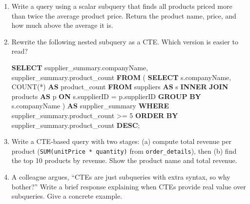 \documentclass[
  letterpaper,
  DIV=11,
  numbers=noendperiod]{scrreprt}
\newenvironment{Shaded}{\begin{snugshade}}{\end{snugshade}}
\newcommand{\DecValTok}[1]{\textcolor[rgb]{0.68,0.00,0.00}{#1}}
\newcommand{\FunctionTok}[1]{\textcolor[rgb]{0.28,0.35,0.67}{#1}}
\newcommand{\KeywordTok}[1]{\textcolor[rgb]{0.00,0.23,0.31}{\textbf{#1}}}
\newcommand{\NormalTok}[1]{\textcolor[rgb]{0.00,0.23,0.31}{#1}}
\newcommand{\OperatorTok}[1]{\textcolor[rgb]{0.37,0.37,0.37}{#1}}
\begin{document}
\begin{tcolorbox}[enhanced jigsaw, opacitybacktitle=0.6, arc=.35mm, colback=white, bottomtitle=1mm, opacityback=0, toprule=.15mm, left=2mm, colbacktitle=quarto-callout-note-color!10!white, breakable, coltitle=black, toptitle=1mm, colframe=quarto-callout-note-color-frame, bottomrule=.15mm, titlerule=0mm, title=\textcolor{quarto-callout-note-color}{\faInfo}\hspace{0.5em}{Exercises}, rightrule=.15mm, leftrule=.75mm]

\begin{enumerate}
\def\labelenumi{\arabic{enumi}.}
\item
  Write a query using a scalar subquery that finds all products priced
  more than twice the average product price. Return the product name,
  price, and how much above the average it is.
\item
  Rewrite the following nested subquery as a CTE. Which version is
  easier to read?

  \begin{codelisting}

  \caption{\texttt{duckdb}}

\begin{Shaded}
\begin{Highlighting}[]
\KeywordTok{SELECT}\NormalTok{ supplier\_summary.companyName, supplier\_summary.product\_count}
\KeywordTok{FROM}\NormalTok{ (}
    \KeywordTok{SELECT}
\NormalTok{        s.companyName,}
        \FunctionTok{COUNT}\NormalTok{(}\OperatorTok{*}\NormalTok{) }\KeywordTok{AS}\NormalTok{ product\_count}
    \KeywordTok{FROM}\NormalTok{ suppliers }\KeywordTok{AS}\NormalTok{ s}
    \KeywordTok{INNER} \KeywordTok{JOIN}\NormalTok{ products }\KeywordTok{AS}\NormalTok{ p }\KeywordTok{ON}\NormalTok{ s.supplierID }\OperatorTok{=}\NormalTok{ p.supplierID}
    \KeywordTok{GROUP} \KeywordTok{BY}\NormalTok{ s.companyName}
\NormalTok{) }\KeywordTok{AS}\NormalTok{ supplier\_summary}
\KeywordTok{WHERE}\NormalTok{ supplier\_summary.product\_count }\OperatorTok{\textgreater{}=} \DecValTok{5}
\KeywordTok{ORDER} \KeywordTok{BY}\NormalTok{ supplier\_summary.product\_count }\KeywordTok{DESC}\NormalTok{;}
\end{Highlighting}
\end{Shaded}

  \end{codelisting}
\item
  Write a CTE-based query with two stages: (a) compute total revenue per
  product (\texttt{SUM(unitPrice\ *\ quantity)} from
  \texttt{order\_details}), then (b) find the top 10 products by
  revenue. Show the product name and total revenue.
\item
  A colleague argues, ``CTEs are just subqueries with extra syntax, so
  why bother?'' Write a brief response explaining when CTEs provide real
  value over subqueries. Give a concrete example.
\end{enumerate}

\end{tcolorbox}
\end{document}
